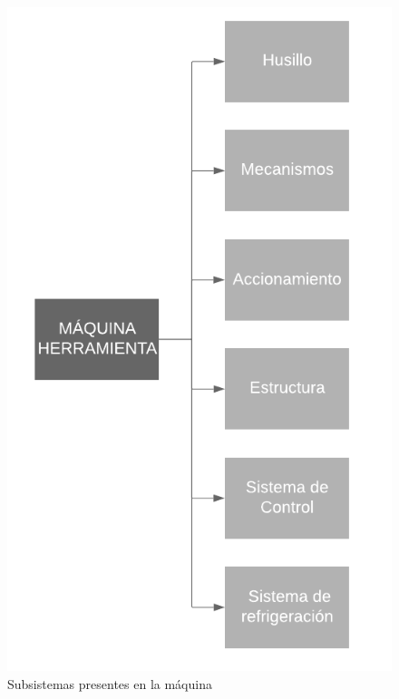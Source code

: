 \begin{figure}[ht!]
    \centering
    \includegraphics[height = 0.7\textheight]{Cap4_DisenoBasico/Figura/Subsistemas.pdf}
    \caption{Subsistemas presentes en la máquina}
    \label{fig:subsystems}
\end{figure}
\newpage


\newpage


\newpage
